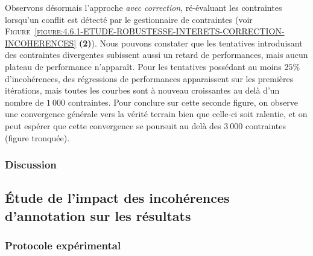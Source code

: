 			
			Observons désormais l'approche \textit{avec correction}, ré-évaluant les contraintes lorsqu'un conflit est détecté par le gestionnaire de contraintes (voir \textsc{Figure~\ref{figure:4.6.1-ETUDE-ROBUSTESSE-INTERETS-CORRECTION-INCOHERENCES}} \textbf{(2)}).
			Nous pouvons constater que les tentatives introduisant des contraintes divergentes subissent aussi un retard de performances, mais aucun plateau de performance n'apparaît.
			Pour les tentatives possédant au moins $25$\% d'incohérences, des régressions de performances apparaissent sur les premières itérations, mais toutes les courbes sont à nouveau croissantes au delà d'un nombre de $1~000$ contraintes.
			Pour conclure sur cette seconde figure, on observe une convergence générale vers la vérité terrain bien que celle-ci soit ralentie, et on peut espérer que cette convergence se poursuit au delà des $3~000$ contraintes (figure tronquée).

		\subsubsection{Discussion}
		
		
			
	
	
	\subsection{Étude de l'impact des incohérences d'annotation sur les résultats}
	\label{section:4.6.2-ETUDE-ROBUSTESSE-SIMULATION-IMPACT-DIFFERENCES}
		
	
		\subsubsection{Protocole expérimental}
			
